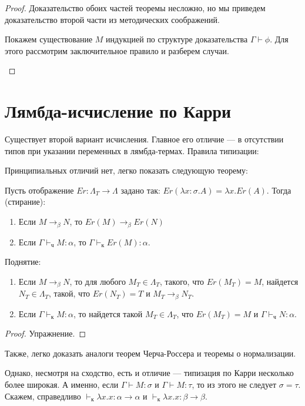 \begin{proof}
Доказательство обоих частей теоремы несложно, но мы приведем доказательство второй части
из методических соображений.

Покажем существование $M$ индукцией по структуре доказательства $\Gamma\vdash\phi$.
Для этого рассмотрим заключительное правило и разберем случаи.

\begin{itemize}
\end{itemize}
\end{proof}

\section{Лямбда-исчисление по Карри}

Существует второй вариант исчисления.
Главное его отличие --- в отсутствии типов при указании переменных в лямбда-термах.
Правила типизации:
 

Принципиальных отличий нет, легко показать следующую теорему:
\begin{theorem}
Пусть отображение $Er: \Lambda_T \rightarrow \Lambda$ задано так:
$Er(\lambda x:\sigma.A) = \lambda x.Er(A)$. Тогда (стирание):

\begin{enumerate}
\item Если $M\rightarrow_\beta N$, то $Er(M)\rightarrow_\beta Er(N)$
\item Если $\Gamma\vdash_\texttt{ч} M:\alpha$, то $\Gamma\vdash_\texttt{к} Er(M):\alpha$.
\end{enumerate}

Поднятие:
\begin{enumerate}
\item Если $M\rightarrow_\beta N$, то для любого $M_T \in \Lambda_T$, такого, что $Er(M_T) = M$,
найдется $N_T \in \Lambda_T$, такой, что $Er(N_T) = T$ и $M_T \rightarrow_\beta N_T$.
\item Если $\Gamma\vdash_\texttt{к} M:\alpha$, то найдется такой $M_T\in\Lambda_T$, 
что $Er(M_T)=M$ и $\Gamma\vdash_\texttt{ч} N:\alpha$.
\end{enumerate}
\end{theorem}

\begin{proof}
Упражнение.
\end{proof}

Также, легко доказать аналоги теорем Черча-Россера и теоремы о нормализации.

Однако, несмотря на сходство, есть и отличие --- типизация по Карри несколько более
широкая. А именно, если $\Gamma\vdash M:\sigma$ и $\Gamma\vdash M:\tau$, 
то из этого не следует $\sigma=\tau$. Скажем, справедливо
$\vdash_\texttt{к}\lambda x.x : \alpha\rightarrow\alpha$ и 
$\vdash_\texttt{к}\lambda x.x : \beta\rightarrow\beta$.

